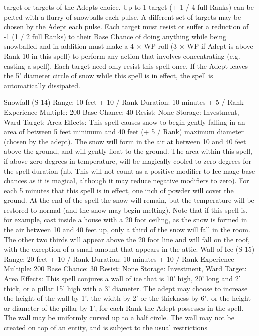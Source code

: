 \documentclass[a4paper]{article}
\begin{document}
\begin{multicols}{3}
target or targets of the Adepts choice. Up to 1
target (+ 1 / 4 full Ranks) can be pelted with a
flurry of snowballs each pulse. A different set of
targets may be chosen by the Adept each pulse.
Each target must resist or suffer a reduction of -1%
(1 / 2 full Ranks) to their Base Chance of doing
anything while being snowballed and in addition
must make a 4 × WP roll (3 × WP if Adept is
above Rank 10 in this spell) to perform any action
that involves concentrating (e.g. casting a spell).
Each target need only resist this spell once. If the
Adept leaves the 5’ diameter circle of snow while
this spell is in effect, the spell is automatically
dissipated.

Snowfall (S-14)
Range: 10 feet + 10 / Rank
Duration: 10 minutes + 5 / Rank
Experience Multiple: 200
Base Chance: 40%
Resist: None
Storage: Investment, Ward
Target: Area
Effects: This spell causes snow to begin gently
falling in an area of between 5 feet minimum and
40 feet (+ 5 / Rank) maximum diameter (chosen by
the adept). The snow will form in the air at between 10 and 40 feet above the ground, and will
gently float to the ground. The area within this
spell, if above zero degrees in temperature, will be
magically cooled to zero degrees for the spell
duration (nb. This will not count as a positive
modifier to Ice mage base chances as it is magical,
although it may reduce negative modifiers to zero).
For each 5 minutes that this spell is in effect, one
inch of powder will cover the ground. At the end of
the spell the snow will remain, but the temperature
will be restored to normal (and the snow may begin
melting). Note that if this spell is, for example, cast
inside a house with a 20 foot ceiling, as the snow is
formed in the air between 10 and 40 feet up, only a
third of the snow will fall in the room. The other
two thirds will appear above the 20 foot line and
will fall on the roof, with the exception of a small
amount that appears in the attic.
Wall of Ice (S-15)
Range: 20 feet + 10 / Rank
Duration: 10 minutes + 10 / Rank
Experience Multiple: 200
Base Chance: 30%
Resist: None
Storage: Investment, Ward
Target: Area
Effects: This spell conjures a wall of ice that is 10’
high, 20’ long and 2’ thick, or a pillar 15’ high
with a 3’ diameter. The adept may choose to increase the height of the wall by 1’, the width by 2’
or the thickness by 6", or the height or diameter of
the pillar by 1’, for each Rank the Adept possesses
in the spell. The wall may be uniformly curved up
to a half circle. The wall may not be created on top
of an entity, and is subject to the usual restrictions

\end{multicols}
\end{document}
